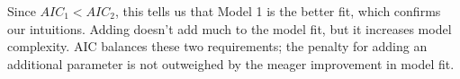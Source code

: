 Since $AIC_1 < AIC_2$, this tells us that Model 1 is the better fit, which confirms our intuitions. Adding  doesn't add much to the model fit, but it increases model complexity.  AIC balances these two requirements; the penalty for adding an additional parameter is not outweighed by the meager improvement in model fit.

\begin{comment} %
\SUBSECTION{Backward elimination}

In backward elimination you start with the complete regression model, including all possible predictors. Then, at each ``step'' we try all possible ways of removing one of the variables, and whichever of these is best (in terms of lowest AIC value) is accepted. This becomes our new regression model, and we then try all possible deletions from the new model, again choosing the option with lowest AIC. This process continues until we end up with a model that has a lower AIC value than any of the other possible models that you could produce by deleting one of its predictors. 

\SUBSECTION{Forward selection}

As an alternative, you can also try \keyterm{forward selection}. This time around we start with the smallest possible model as our start point, and only consider the possible additions to the model. However, there's one complication. You also need to specify what the largest possible model you're willing to entertain is.

Although backward and forward selection can lead to the same conclusion, they don't always.

\SUBSECTION{A caveat}

Automated variable selection methods are seductive things, especially when they're bundled up in (fairly) simple functions in powerful statistical programmes. They provide an element of objectivity to your model selection, and that's kind of nice. Unfortunately, they're sometimes used as an excuse for thoughtlessness. No longer do you have to think carefully about which predictors to add to the model and what the theoretical basis for their inclusion might be. Everything is solved by the magic of AIC. And if we start throwing around phrases like Ockham's razor, well it sounds like everything is wrapped up in a nice neat little package that no-one can argue with.


\end{comment}
